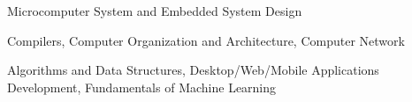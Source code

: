 \begin{cvlist}
    \begin{cvcourses}
        Microcomputer System and Embedded System Design
    \end{cvcourses}

    \begin{cvcourses}
        Compilers, Computer Organization and Architecture, Computer Network
    \end{cvcourses}

    \begin{cvcourses}
        Algorithms and Data Structures, Desktop/Web/Mobile Applications Development,
        Fundamentals of Machine Learning
    \end{cvcourses}

\end{cvlist}

\endinput